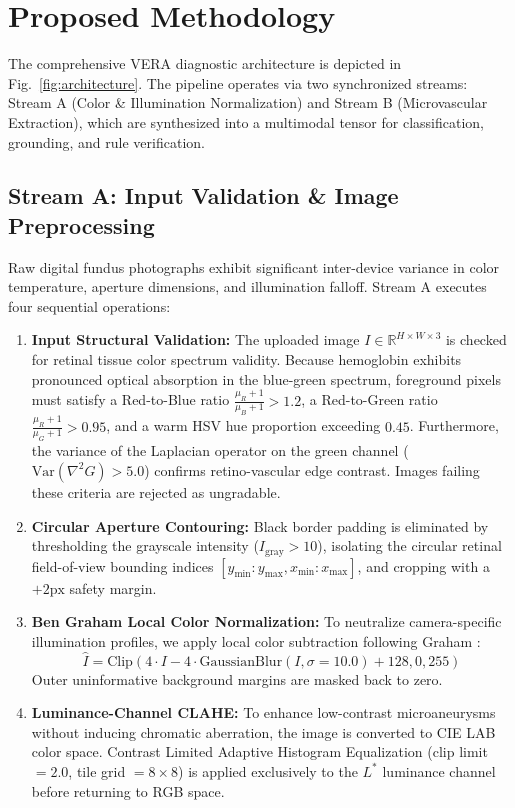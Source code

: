 \documentclass[conference]{IEEEtran}
\begin{document}
\section{Proposed Methodology}

The comprehensive VERA diagnostic architecture is depicted in Fig.~\ref{fig:architecture}. The pipeline operates via two synchronized streams: Stream A (Color \& Illumination Normalization) and Stream B (Microvascular Extraction), which are synthesized into a multimodal tensor for classification, grounding, and rule verification.

\subsection{Stream A: Input Validation \& Image Preprocessing}
Raw digital fundus photographs exhibit significant inter-device variance in color temperature, aperture dimensions, and illumination falloff. Stream A executes four sequential operations:

\begin{enumerate}
    \item \textbf{Input Structural Validation:} The uploaded image $I \in \mathbb{R}^{H \times W \times 3}$ is checked for retinal tissue color spectrum validity. Because hemoglobin exhibits pronounced optical absorption in the blue-green spectrum, foreground pixels must satisfy a Red-to-Blue ratio $\frac{\mu_R + 1}{\mu_B + 1} > 1.2$, a Red-to-Green ratio $\frac{\mu_R + 1}{\mu_G + 1} > 0.95$, and a warm HSV hue proportion exceeding $0.45$. Furthermore, the variance of the Laplacian operator on the green channel ($\text{Var}(\nabla^2 G) > 5.0$) confirms retino-vascular edge contrast. Images failing these criteria are rejected as ungradable.
    \item \textbf{Circular Aperture Contouring:} Black border padding is eliminated by thresholding the grayscale intensity ($I_{\text{gray}} > 10$), isolating the circular retinal field-of-view bounding indices $[y_{\min}:y_{\max}, x_{\min}:x_{\max}]$, and cropping with a $+2\text{px}$ safety margin.
    \item \textbf{Ben Graham Local Color Normalization:} To neutralize camera-specific illumination profiles, we apply local color subtraction following Graham \cite{graham2015kaggle}:
    \begin{equation}
        \hat{I} = \text{Clip}\left( 4 \cdot I - 4 \cdot \text{GaussianBlur}(I, \sigma=10.0) + 128, 0, 255 \right)
    \end{equation}
    Outer uninformative background margins are masked back to zero.
    \item \textbf{Luminance-Channel CLAHE:} To enhance low-contrast microaneurysms without inducing chromatic aberration, the image is converted to CIE LAB color space. Contrast Limited Adaptive Histogram Equalization (clip limit $=2.0$, tile grid $=8 \times 8$) is applied exclusively to the $L^*$ luminance channel before returning to RGB space.
\end{enumerate}
\end{document}
